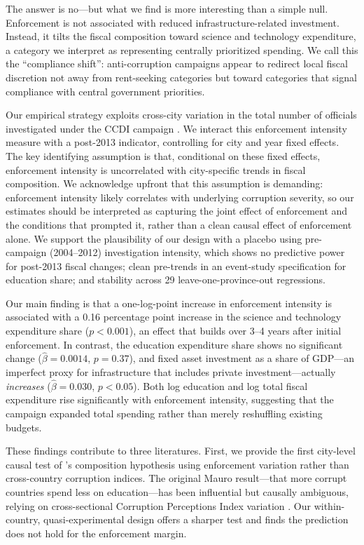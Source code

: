 \documentclass[12pt]{article}
\begin{document}
The answer is no---but what we find is more interesting than a simple null. Enforcement is not associated with reduced infrastructure-related investment. Instead, it tilts the fiscal composition toward science and technology expenditure, a category we interpret as representing centrally prioritized spending. We call this the ``compliance shift'': anti-corruption campaigns appear to redirect local fiscal discretion not away from rent-seeking categories but toward categories that signal compliance with central government priorities.

Our empirical strategy exploits cross-city variation in the total number of officials investigated under the CCDI campaign \citep{wang2020data}. We interact this enforcement intensity measure with a post-2013 indicator, controlling for city and year fixed effects. The key identifying assumption is that, conditional on these fixed effects, enforcement intensity is uncorrelated with city-specific trends in fiscal composition. We acknowledge upfront that this assumption is demanding: enforcement intensity likely correlates with underlying corruption severity, so our estimates should be interpreted as capturing the joint effect of enforcement and the conditions that prompted it, rather than a clean causal effect of enforcement alone. We support the plausibility of our design with a placebo using pre-campaign (2004--2012) investigation intensity, which shows no predictive power for post-2013 fiscal changes; clean pre-trends in an event-study specification for education share; and stability across 29 leave-one-province-out regressions.

Our main finding is that a one-log-point increase in enforcement intensity is associated with a 0.16 percentage point increase in the science and technology expenditure share ($p < 0.001$), an effect that builds over 3--4 years after initial enforcement. In contrast, the education expenditure share shows no significant change ($\hat{\beta} = 0.0014$, $p = 0.37$), and fixed asset investment as a share of GDP---an imperfect proxy for infrastructure that includes private investment---actually \emph{increases} ($\hat{\beta} = 0.030$, $p < 0.05$). Both log education and log total fiscal expenditure rise significantly with enforcement intensity, suggesting that the campaign expanded total spending rather than merely reshuffling existing budgets.

These findings contribute to three literatures. First, we provide the first city-level causal test of \citet{mauro1998}'s composition hypothesis using enforcement variation rather than cross-country corruption indices. The original Mauro result---that more corrupt countries spend less on education---has been influential but causally ambiguous, relying on cross-sectional Corruption Perceptions Index variation \citep{tanzi1998, svensson2005}. Our within-country, quasi-experimental design offers a sharper test and finds the prediction does not hold for the enforcement margin.
\end{document}

